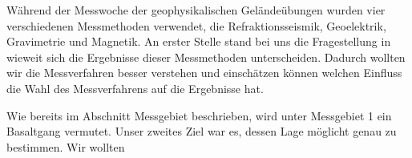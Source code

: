 Während der Messwoche der geophysikalischen Geländeübungen wurden vier verschiedenen Messmethoden verwendet, die Refraktionsseismik, Geoelektrik, Gravimetrie und Magnetik. An erster Stelle stand bei uns die Fragestellung in wieweit sich die Ergebnisse dieser Messmethoden unterscheiden. Dadurch wollten wir die Messverfahren besser verstehen und einschätzen können welchen Einfluss die Wahl des Messverfahrens auf die Ergebnisse hat.

Wie bereits im Abschnitt Messgebiet beschrieben, wird unter Messgebiet 1 ein Basaltgang vermutet. Unser zweites Ziel war es, dessen Lage möglicht genau zu bestimmen. Wir wollten  